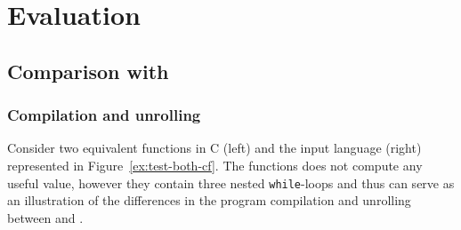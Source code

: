 \chapter{Evaluation}
\label{ch:eval}


\section{Comparison with \porthos[1]}
\label{ch:eval:show}

\subsection{Compilation and unrolling}
\label{ch:eval:show:compil}

Consider two equivalent functions in C (left) and the \porthos[1] input language (right) represented in Figure~\ref{ex:test-both-cf}. %
The functions does not compute any useful value, however they contain three nested \texttt{while}-loops and thus can serve as an illustration of the differences in the program compilation and unrolling between \porthos[1] and \porthos[2].

